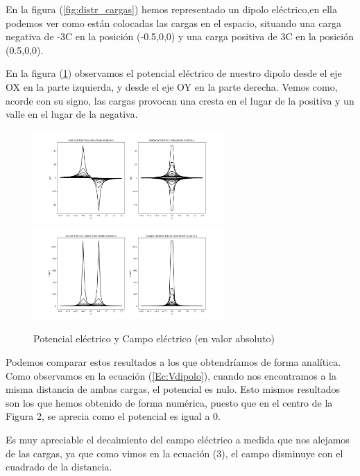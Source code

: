 \documentclass[11pt]{article}
\begin{document}
    \vspace{0.4cm}En la figura (\ref{fig:distr_cargas}) hemos representado un dipolo eléctrico,en ella podemos ver como están colocadas las cargas en el espacio, situando una carga negativa de -3C en la posición (-0.5,0,0) y una carga positiva de 3C en la posición (0.5,0,0).
        
    \vspace{0.4cm} En la figura (\ref{fig:potencial}) observamos el potencial eléctrico de nuestro dipolo desde el eje OX en la parte izquierda, y desde el eje OY en la parte derecha. Vemos como, acorde con su signo, las cargas provocan una cresta en el lugar de la positiva y un valle en el lugar de la negativa.

    \clearpage
    \begin{figure}[h]
        \centering
        \vspace{-1cm}
        \includegraphics[width=0.65\textwidth]{dipolo2.png}
        \includegraphics[width=0.65\textwidth]{dipolo3.PNG}
        \caption{Potencial eléctrico y Campo eléctrico (en valor absoluto)}
        \label{fig:potencial}
    \end{figure}

    Podemos comparar estos resultados a los que obtendríamos de forma analítica. Como observamos en la ecuación (\ref{Ec:Vdipolo}), cuando nos encontramos a la misma distancia de ambas cargas, el potencial es nulo. Esto mismos resultados son los que hemos obtenido de forma numérica, puesto que en el centro de la Figura 2, se aprecia como el potencial es igual a 0.
    
    \vspace{0.4cm} Es muy apreciable el decaimiento del campo eléctrico a medida que nos alejamos de las cargas, ya que como vimos en la ecuación (3), el campo disminuye con el cuadrado de la distancia.
\end{document}
